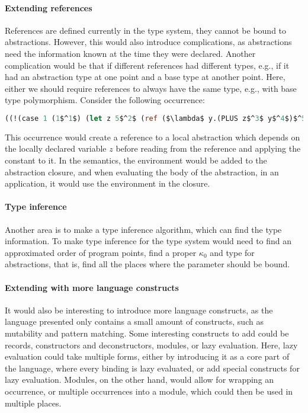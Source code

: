 \documentclass[../../master.tex]{subfiles}
\begin{document}
\paragraph{Extending references}
References are defined currently in the type system, they cannot be bound to abstractions.
However, this would also introduce complications, as abstractions need the information known at the time they were declared.
Another complication would be that if different references had different types, e.g., if it had an abstraction type at one point and a base type at another point.
Here, either we should require references to always have the same type, e.g., with base type polymorphism.
Consider the following occurrence:
\begin{lstlisting}[language=Caml, mathescape=true]
((!(case 1 (1$^1$) (let z 5$^2$ (ref ($\lambda$ y.(PLUS z$^3$ y$^4$)$^5$)$^6$))$^7$)$^8$)$^9$ 5)$^{10}$
\end{lstlisting}
This occurrence would create a reference to a local abstraction which depends on the locally declared variable $z$ before reading from the reference and applying the constant to it.
In the semantics, the environment would be added to the abstraction closure, and when evaluating the body of the abstraction, in an application, it would use the environment in the closure.

\paragraph{Type inference}
Another area is to make a type inference algorithm, which can find the type information.
To make type inference for the type system would need to find an approximated order of program points, find a proper $\kappa_0$ and type for abstractions, that is, find all the places where the parameter should be bound.

\paragraph{Extending with more language constructs}
It would also be interesting to introduce more language constructs, as the language presented only contains a small amount of constructs, such as mutability and pattern matching.
Some interesting constructs to add could be records, constructors and deconstructors, modules, or lazy evaluation.
Here, lazy evaluation could take multiple forms, either by introducing it as a core part of the language, where every binding is lazy evaluated, or add special constructs for lazy evaluation.
Modules, on the other hand, would allow for wrapping an occurrence, or multiple occurrences into a module, which could then be used in multiple places.
\end{document}
